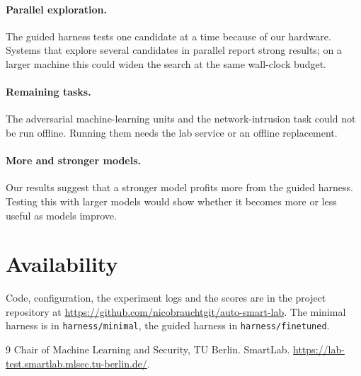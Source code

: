 \documentclass[letterpaper,twocolumn,10pt]{article}
\begin{document}
\paragraph{Parallel exploration.} The guided harness tests one candidate at
a time because of our hardware. Systems that explore several candidates in
parallel report strong results; on a larger machine this could widen the
search at the same wall-clock budget.

\paragraph{Remaining tasks.} The adversarial machine-learning units and the
network-intrusion task could not be run offline. Running them needs the lab
service or an offline replacement.

\paragraph{More and stronger models.} Our results suggest that a stronger
model profits more from the guided harness. Testing this with larger models
would show whether it becomes more or less useful as models improve.

\section*{Availability}

Code, configuration, the experiment logs and the scores are in the project
repository at \url{https://github.com/nicobrauchtgit/auto-smart-lab}. The
minimal harness is in \texttt{harness/minimal}, the guided harness in
\texttt{harness/finetuned}.

\begin{thebibliography}{9}
Chair of Machine Learning and Security, TU Berlin.
\newblock SmartLab.
\newblock \url{https://lab-test.smartlab.mlsec.tu-berlin.de/}.
\end{thebibliography}
\end{document}
